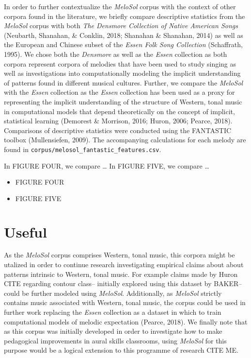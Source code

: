 \documentclass[english,man]{apa6}
\providecommand{\tightlist}{%
  \setlength{\itemsep}{0pt}\setlength{\parskip}{0pt}}
\begin{document}
In order to further contextualize the \emph{MeloSol} corpus with the context of other corpora found in the literature, we briefly compare descriptive statistics from the \emph{MeloSol} corpus with both \emph{The Densmore Collection of Native American Songs} (Neubarth, Shanahan, \& Conklin, 2018; Shanahan \& Shanahan, 2014) as well as the European and Chinese subset of the \emph{Essen Folk Song Collection} (Schaffrath, 1995).
We chose both the \emph{Densmore} as well as the \emph{Essen} collection as both corpora represent corpora of melodies that have been used to study singing as well as investigations into computationally modeling the implicit understanding of patterns found in different musical cultures.
Further, we compare the \emph{MeloSol} with the \emph{Essen} collection as the \emph{Essen} collection has been used as a proxy for representing the implicit understanding of the structure of Western, tonal music in computational models that depend theoretically on the concept of implicit, statistical learning (Demorest \& Morrison, 2016; Huron, 2006; Pearce, 2018).
Comparisons of descriptive statistics were conducted using the FANTASTIC toolbox (Mullensiefen, 2009).
The accompanying calculations for each melody are found in \texttt{corpus/melosol\_fantastic\_features.csv}.

In FIGURE FOUR, we compare \ldots{}
In FIGURE FIVE, we compare \ldots{}

\begin{itemize}
\tightlist
\item
  FIGURE FOUR
\item
  FIGURE FIVE
\end{itemize}

\hypertarget{useful}{%
\section{Useful}\label{useful}}

As the \emph{MeloSol} corpus comprises Western, tonal music, this corpora might be utalized in order to continue research investigating empirical claims about about patterns intrinsic to Western, tonal music.
For example claims made by Huron CITE regarding contour class-- initially explored using this dataset by BAKER-- could be further modeled using \emph{MeloSol}.
Additionally, as \emph{MeloSol} strictly contains music associated with Western, tonal music, the corpus could be used in further work replacing the \emph{Essen} collection as a dataset in which to train computational models of melodic expectation (Pearce, 2018).
We finally note that as this corpus was initially developed in order to investigate how to make pedagogical improvements in aural skills classrooms, using \emph{MeloSol} for this purpose would be a logical extension to this programme of research CITE ME.
\end{document}
